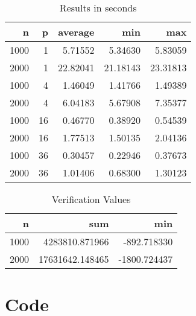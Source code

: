 \documentclass[a4paper]{article}
\begin{document}
    \begin{table}[!htp]
      \center
      \begin{tabular}{*{5}{r}}
        \textbf{n} &  \textbf{p} &   \textbf{average} &       \textbf{min} &       \textbf{max} \\
    \midrule
     1000 & 1 & 5.71552 & 5.34630 & 5.83059\\
     2000 & 1 & 22.82041 & 21.18143 & 23.31813\\
     1000 & 4 & 1.46049 & 1.41766 & 1.49389\\
     2000 & 4 & 6.04183 & 5.67908 & 7.35377\\
     1000 & 16 & 0.46770 & 0.38920 & 0.54539\\
     2000 & 16 & 1.77513 & 1.50135 & 2.04136\\
     1000 & 36 & 0.30457 & 0.22946 & 0.37673\\
     2000 & 36 & 1.01406 & 0.68300 & 1.30123\\
      \end{tabular}
      \caption{Results in seconds}
      \label{tab:Results}
    \end{table}
        
    \begin{table}[!htp]
      \center
      \begin{tabular}{*{3}{r}}
        \textbf{n} &   \textbf{sum} &       \textbf{min}\\
    \midrule
     1000 &  4283810.871966  & -892.718330   \\
     2000 & 17631642.148465  & -1800.724437  \\
      \end{tabular}
      \caption{Verification Values}
      \label{tab:Verification}
    \end{table}


\newpage
\appendix
\section{Code}
    
\end{document}
